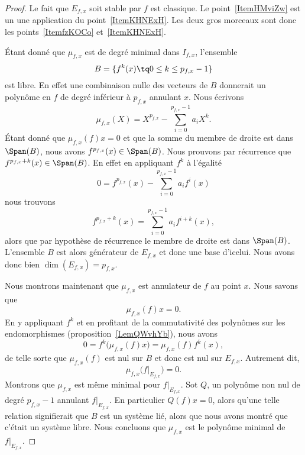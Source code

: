 \begin{proof}
    Le fait que \( E_{f,x}\) soit stable par \( f\) est classique. Le point~\ref{ItemHMviZw} est un une application du point~\ref{ItemKHNExH}. Les deux gros morceaux sont donc les points~\ref{ItemfzKOCo} et~\ref{ItemKHNExH}.

    Étant donné que \( \mu_{f,x}\) est de degré minimal dans \( I_{f,x}\), l'ensemble
    \begin{equation}
        B=\{ f^k(x)\tq 0\leq k\leq p_{f,x}-1 \}
    \end{equation}
    est libre. En effet une combinaison nulle des vecteurs de \( B\) donnerait un polynôme en \( f\) de degré inférieur à \( p_{f,x}\) annulant \( x\). Nous écrivons
    \begin{equation}
        \mu_{f,x}(X)=X^{p_{f,x}}-\sum_{i=0}^{p_{f,x}-1}a_iX^k.
    \end{equation}
    Étant donné que \( \mu_{f,x}(f)x=0\) et que la somme du membre de droite est dans \( \Span(B)\), nous avons \( f^{p_{f,x}}(x)\in\Span(B)\). Nous prouvons par récurrence que \( f^{p_{f,x}+k}(x)\in\Span(B)\). En effet en appliquant \( f^k\) à l'égalité
    \begin{equation}
        0=f^{p_{f,x}}(x)-\sum_{i=0}^{p_{f,x}-1}a_if^i(x)
    \end{equation}
    nous trouvons
    \begin{equation}
        f^{p_{f,x}+k}(x)=\sum_{i=0}^{p_{f,x}-1}a_if^{i+k}(x),
    \end{equation}
    alors que par hypothèse de récurrence le membre de droite est dans \( \Span(B)\). L'ensemble \( B\) est alors générateur de \( E_{f,x}\) et donc une base d'icelui. Nous avons donc bien \( \dim(E_{f,x})=p_{f,x}\).

    Nous montrons maintenant que \( \mu_{f,x}\) est annulateur de \( f\) au point \( x\). Nous savons que
    \begin{equation}
        \mu_{f,x}(f)x=0.
    \end{equation}
    En y appliquant \( f^k\) et en profitant de la commutativité des polynômes sur les endomorphismes (proposition~\ref{LemQWvhYb}), nous avons
    \begin{equation}
        0=f^k\big( \mu_{f,x}(f)x \big)=\mu_{f,x}(f)f^k(x),
    \end{equation}
    de telle sorte que \( \mu_{f,x}(f)\) est nul sur \( B\) et donc est nul sur \( E_{f,x}\). Autrement dit,
    \begin{equation}
        \mu_{f,x}\big( f|_{E_{f,x}} \big)=0.
    \end{equation}
    Montrons que \( \mu_{f,x}\) est même minimal pour \( f|_{E_{f,x}}\). Sot \( Q\), un polynôme non nul de degré \( p_{f,x}-1\) annulant \( f|_{E_{f,x}}\). En particulier \( Q(f)x=0\), alors qu'une telle relation signifierait que \( B\) est un système lié, alors que nous avons montré que c'était un système libre. Nous concluons que \( \mu_{f,x}\) est le polynôme minimal de \( f|_{E_{f,x}}\).
\end{proof}

